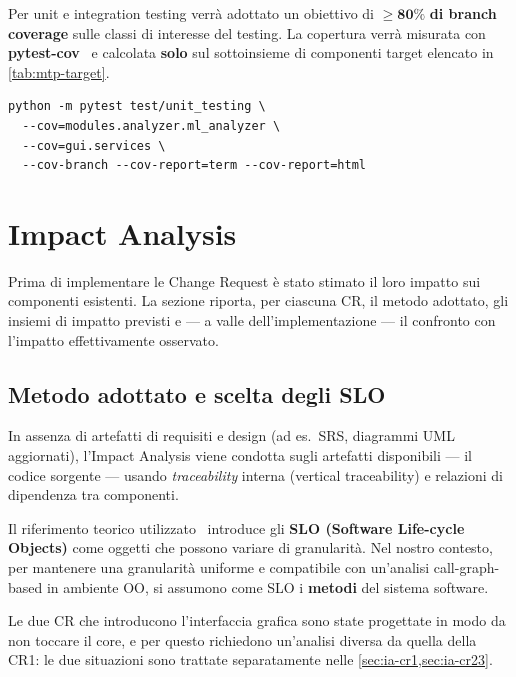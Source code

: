\documentclass[11pt,a4paper]{article}
\begin{document}
Per unit e integration testing verr\`a adottato un obiettivo di
$\geq \mathbf{80\%}$ \textbf{di branch coverage} sulle classi di interesse del
testing. La copertura verr\`a misurata con \textbf{pytest-cov}~\cite{pytestcov} e
calcolata \textbf{solo} sul sottoinsieme di componenti target elencato in
\cref{tab:mtp-target}.

\begin{lstlisting}[style=markshell,caption={Comando di misura della branch coverage}]
python -m pytest test/unit_testing \
  --cov=modules.analyzer.ml_analyzer \
  --cov=gui.services \
  --cov-branch --cov-report=term --cov-report=html
\end{lstlisting}

\section{Impact Analysis}
\label{sec:ia}

Prima di implementare le Change Request \`e stato stimato il loro impatto sui
componenti esistenti. La sezione riporta, per ciascuna CR, il metodo adottato,
gli insiemi di impatto previsti e --- a valle dell'implementazione --- il
confronto con l'impatto effettivamente osservato.

\subsection{Metodo adottato e scelta degli SLO}
\label{sec:ia-metodo}

In assenza di artefatti di requisiti e design (ad es.\ SRS, diagrammi UML
aggiornati), l'Impact Analysis viene condotta sugli artefatti disponibili --- il
codice sorgente --- usando \emph{traceability} interna (vertical traceability) e
relazioni di dipendenza tra componenti.

Il riferimento teorico utilizzato~\cite{tripathynaik} introduce gli \textbf{SLO
(Software Life-cycle Objects)} come oggetti che possono variare di
granularit\`a. Nel nostro contesto, per mantenere una granularit\`a uniforme e
compatibile con un'analisi call-graph-based in ambiente OO, si assumono come SLO
i \textbf{metodi} del sistema software.

Le due CR che introducono l'interfaccia grafica sono state progettate in modo da
non toccare il core, e per questo richiedono un'analisi diversa da quella della
CR1: le due situazioni sono trattate separatamente nelle
\cref{sec:ia-cr1,sec:ia-cr23}.
\end{document}

